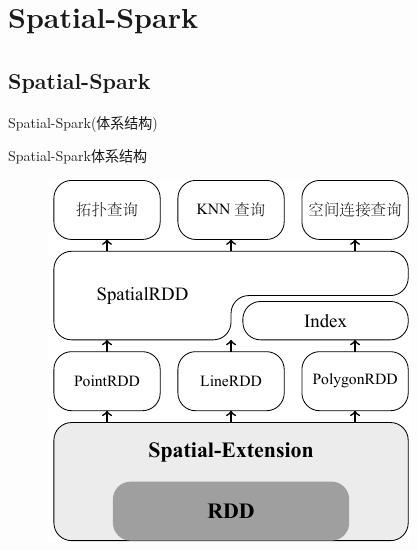 \section{Spatial-Spark}

\subsection{Spatial-Spark}


\begin{frame}[c]{Spatial-Spark(体系结构)}
    \begin{center}
        \alert{Spatial-Spark体系结构}
    

    \vspace{1em}
    \begin{figure}
        \includegraphics[scale=1.0]{figures/spatialspark.pdf}
    \end{figure}
    \end{center}
\end{frame}



